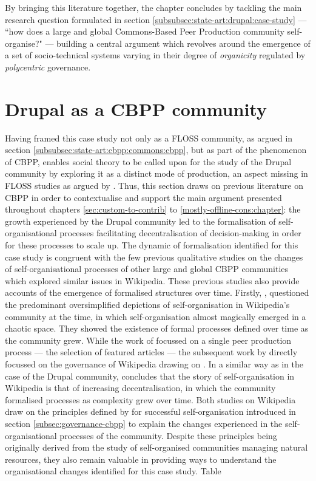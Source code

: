 By bringing this literature together, the chapter concludes by tackling the main research question formulated in section \ref{subsubsec:state-art:drupal:case-study} ---  ``how does a large and global Commons-Based Peer Production community self-organise?" --- building a central argument which revolves around the emergence of a set of socio-technical systems varying in their degree of \textit{organicity} regulated by \textit{polycentric} governance.

\section{Drupal as a CBPP community}
\label{sec:ostrom}

Having framed this case study not only as a FLOSS community, as argued in section \ref{subsubsec:state-art:cbpp:commons:cbpp}, but as part of the phenomenon of CBPP, enables social theory to be called upon for the study of the Drupal community by exploring it as a distinct mode of production, an aspect missing in FLOSS studies as argued by \textcite{glaser2007social}. Thus, this section draws on previous literature on CBPP in order to contextualise and support the main argument presented throughout chapters \ref{sec:custom-to-contrib} to \ref{mostly-offline-cons:chapter}: the growth experienced by the Drupal community led to the formalisation of self-organisational processes facilitating decentralisation of decision-making in order for these processes to scale up. The dynamic of formalisation identified for this case study is congruent with the few previous qualitative studies \parencite{viegas2007hidden, forte2009decentralization} on the changes of self-organisational processes of other large and global CBPP communities which explored similar issues in Wikipedia. These previous studies also provide accounts of the emergence of formalised structures over time. Firstly, \textcite{viegas2007hidden}, questioned the predominant oversimplified depictions of self-organisation in Wikipedia's community at the time, in which self-organisation almost magically emerged in a chaotic space. They showed the existence of formal processes defined over time as the community grew. While the work of \textcite{viegas2007hidden} focussed on a single peer production process --- the selection of featured articles ---  the subsequent work by \textcite{forte2009decentralization} directly focussed on the governance of Wikipedia drawing on \textcite{viegas2007hidden}. In a similar way as in the case of the Drupal community, \textcite[71]{forte2009decentralization} concludes that the story of self-organisation in Wikipedia is that of increasing decentralisation, in which the community formalised processes as complexity grew over time. Both studies on Wikipedia draw on the principles defined by \textcite[88-102]{ostrom1990governing} for successful self-organisation introduced in section \ref{subsec:governance-cbpp} to explain the changes experienced in the self-organisational processes of the community. Despite these principles being originally derived from the study of self-organised communities managing natural resources, they also remain valuable in providing ways to understand the organisational changes identified for this case study. Table 